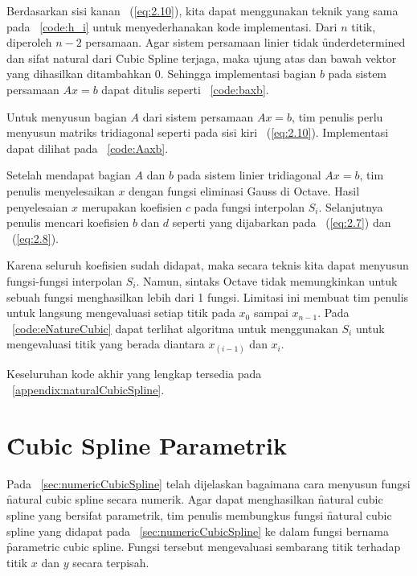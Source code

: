 Berdasarkan sisi kanan \equ~(\ref{eq:2.10}), kita dapat menggunakan teknik yang sama pada
\lst~\ref{code:h_i} untuk menyederhanakan kode implementasi. Dari $n$ titik,
diperoleh $n-2$ persamaan. Agar sistem persamaan linier tidak \f{underdetermined}
dan sifat natural dari \f{Cubic Spline} terjaga, maka ujung atas dan bawah vektor
yang dihasilkan ditambahkan $0$. Sehingga implementasi bagian $b$ pada sistem
persamaan $A x = b$ dapat ditulis seperti \lst~\ref{code:baxb}.



Untuk menyusun bagian $A$ dari sistem persamaan $A x = b$, tim penulis perlu
menyusun matriks tridiagonal seperti pada sisi kiri \equ~(\ref{eq:2.10}). Implementasi dapat
dilihat pada \lst~\ref{code:Aaxb}.



Setelah mendapat bagian $A$ dan $b$ pada sistem linier tridiagonal $A x = b$,
tim penulis menyelesaikan $x$ dengan fungsi eliminasi Gauss di Octave. Hasil
penyelesaian $x$ merupakan koefisien $c$ pada fungsi interpolan $S_i$.
Selanjutnya penulis mencari koefisien $b$ dan $d$ seperti yang dijabarkan
pada \equ~(\ref{eq:2.7}) dan \equ~(\ref{eq:2.8}).

Karena seluruh koefisien sudah didapat, maka secara teknis kita dapat menyusun
fungsi-fungsi interpolan $S_i$. Namun, sintaks Octave tidak memungkinkan untuk
sebuah fungsi menghasilkan lebih dari 1 fungsi. Limitasi ini membuat tim
penulis untuk langsung mengevaluasi setiap titik pada $x_0$ sampai $x_{n-1}$.
Pada \lst~\ref{code:eNatureCubic} dapat terlihat algoritma untuk menggunakan
$S_i$ untuk mengevaluasi titik yang berada diantara $x_(i-1)$ dan $x_i$.



Keseluruhan kode akhir yang lengkap tersedia pada \apdx~\ref{appendix:naturalCubicSpline}.

\section{\f{Cubic Spline} Parametrik}
\label{sec:parametricSpline}
Pada \sect~\ref{sec:numericCubicSpline} telah dijelaskan bagaimana cara menyusun
fungsi \f{natural cubic spline} secara numerik. Agar dapat menghasilkan
\f{natural cubic spline} yang bersifat parametrik, tim penulis membungkus fungsi
\f{natural cubic spline} yang didapat pada \sect~\ref{sec:numericCubicSpline} ke
dalam fungsi bernama \f{parametric cubic spline}. Fungsi tersebut mengevaluasi
sembarang titik terhadap titik $x$ dan $y$ secara terpisah.

